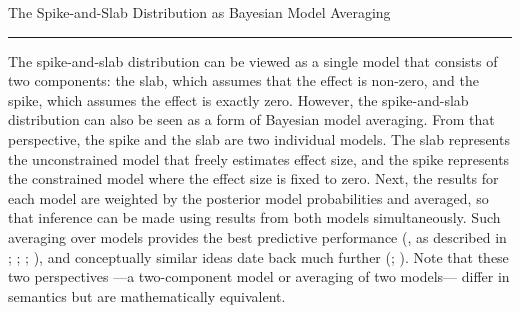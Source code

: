 \documentclass[a4paper]{article}
\begin{document}
\begin{NewBox2}[label=box:box1]{The Spike-and-Slab Distribution as Bayesian Model Averaging}{}%
	\vspace{6pt}\hrule\vspace{6pt}
	The spike-and-slab distribution can be viewed as a single model that consists of two components: the slab, which assumes that the effect is non-zero, and the spike, which assumes the effect is exactly zero. However, the spike-and-slab distribution can also be seen as a form of Bayesian model averaging. From that perspective, the spike and the slab are two individual models. The slab represents the unconstrained model that freely estimates effect size, and the spike represents the constrained model where the effect size is fixed to zero. Next, the results for each model are weighted by the posterior model probabilities and averaged, so that inference can be made using results from both models simultaneously. Such averaging over models provides the best predictive performance (, as described in ; ; ; ), and conceptually similar ideas date back much further (; ). Note that these two perspectives ---a two-component model or averaging of two models--- differ in semantics but are mathematically equivalent.
\end{NewBox2}
\end{document}

